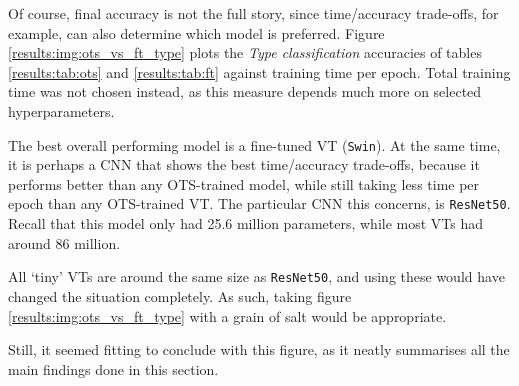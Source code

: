 Of course, final accuracy is not the full story, since time/accuracy trade-offs, for example, can also determine which model is preferred. Figure \ref{results:img:ots_vs_ft_type} plots the \textit{Type classification} accuracies of tables \ref{results:tab:ots} and \ref{results:tab:ft} against training time per epoch. Total training time was not chosen instead, as this measure depends much more on selected hyperparameters.

The best overall performing model is a fine-tuned VT (\texttt{Swin}). At the same time, it is perhaps a CNN that shows the best time/accuracy trade-offs, because it performs better than any OTS-trained model, while still taking less time per epoch than any OTS-trained VT. The particular CNN this concerns, is \texttt{ResNet50}. Recall that this model only had 25.6 million parameters, while most VTs had around 86 million.

All `tiny' VTs are around the same size as \texttt{ResNet50}, and using these would have changed the situation completely. As such, taking figure \ref{results:img:ots_vs_ft_type} with a grain of salt would be appropriate.

Still, it seemed fitting to conclude with this figure, as it neatly summarises all the main findings done in this section.
